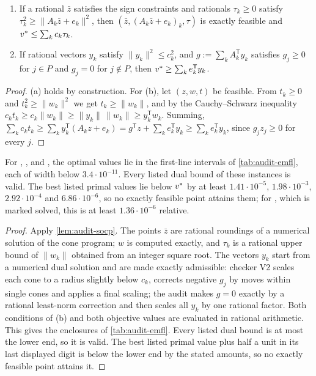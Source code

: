 \begin{lemma}\label{lem:audit-socp}
\begin{enumerate}
\item[(a)] If a rational $\bar z$ satisfies the sign constraints and rationals $\tau_k\ge0$ satisfy $\tau_k^2\ge\|A_k\bar z+e_k\|^2$, then $(\bar z,(A_k\bar z+e_k)_k,\tau)$ is exactly feasible and $v^{*}\le\sum_kc_k\tau_k$.
\item[(b)] If rational vectors $y_k$ satisfy $\|y_k\|^2\le c_k^2$, and $g:=\sum_kA_k^{\mathsf T}y_k$ satisfies $g_j\ge0$ for $j\in P$ and $g_j=0$ for $j\notin P$, then $v^{*}\ge\sum_ke_k^{\mathsf T}y_k$.
\end{enumerate}
\end{lemma}

\begin{proof}
(a) holds by construction.
For (b), let $(z,w,t)$ be feasible.
From $t_k\ge0$ and $t_k^2\ge\|w_k\|^2$ we get $t_k\ge\|w_k\|$, and by the Cauchy--Schwarz inequality $c_kt_k\ge c_k\|w_k\|\ge\|y_k\|\,\|w_k\|\ge y_k^{\mathsf T}w_k$.
Summing, $\sum_kc_kt_k\ge\sum_ky_k^{\mathsf T}(A_kz+e_k)=g^{\mathsf T}z+\sum_ke_k^{\mathsf T}y_k\ge\sum_ke_k^{\mathsf T}y_k$, since $g_jz_j\ge0$ for every $j$.
\end{proof}

\begin{proposition}\label{prop:emfl-enclosure}
For , ,  and , the optimal values lie in the first-line intervals of \cref{tab:audit-emfl}, each of width below $3.4\cdot10^{-11}$.
Every listed dual bound of these instances is valid.
The best listed primal values lie below $v^{*}$ by at least $1.41\cdot10^{-5}$, $1.98\cdot10^{-3}$, $2.92\cdot10^{-4}$ and $6.86\cdot10^{-6}$, so no exactly feasible point attains them; for , which is marked solved, this is at least $1.36\cdot10^{-6}$ relative.
\end{proposition}

\begin{proof}
Apply \cref{lem:audit-socp}.
The points $\bar z$ are rational roundings of a numerical solution of the cone program; $w$ is computed exactly, and $\tau_k$ is a rational upper bound of $\|w_k\|$ obtained from an integer square root.
The vectors $y_k$ start from a numerical dual solution and are made exactly admissible: checker V2 scales each cone to a radius slightly below $c_k$, corrects negative $g_j$ by moves within single cones and applies a final scaling; the audit makes $g=0$ exactly by a rational least-norm correction and then scales all $y_k$ by one rational factor.
Both conditions of (b) and both objective values are evaluated in rational arithmetic.
This gives the enclosures of \cref{tab:audit-emfl}.
Every listed dual bound is at most the lower end, so it is valid.
The best listed primal value plus half a unit in its last displayed digit is below the lower end by the stated amounts, so no exactly feasible point attains it.
\end{proof}

